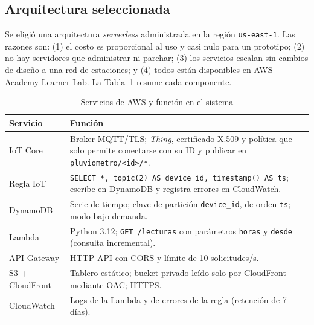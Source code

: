 \documentclass[10pt,twocolumn,letterpaper]{article}
\begin{document}
\subsection{Arquitectura seleccionada}
Se eligió una arquitectura \emph{serverless} administrada en la región \texttt{us-east-1}. Las razones son: (1) el costo es proporcional al uso y casi nulo para un prototipo; (2) no hay servidores que administrar ni parchar; (3) los servicios escalan sin cambios de diseño a una red de estaciones; y (4) todos están disponibles en AWS Academy Learner Lab. La Tabla~\ref{tab:serv} resume cada componente.

\begin{table}[t]
\caption{Servicios de AWS y función en el sistema}
\label{tab:serv}
\centering\footnotesize
\begin{tabularx}{\columnwidth}{@{}lX@{}}
\toprule
Servicio & Función\\
\midrule
IoT Core & Broker MQTT/TLS; \emph{Thing}, certificado X.509 y política que solo permite conectarse con su ID y publicar en \texttt{pluviometro/<id>/*}.\\
Regla IoT & \texttt{SELECT *, topic(2) AS device\_id, timestamp() AS ts}; escribe en DynamoDB y registra errores en CloudWatch.\\
DynamoDB & Serie de tiempo; clave de partición \texttt{device\_id}, de orden \texttt{ts}; modo bajo demanda.\\
Lambda & Python 3.12; \texttt{GET /lecturas} con parámetros \texttt{horas} y \texttt{desde} (consulta incremental).\\
API Gateway & HTTP API con CORS y límite de 10 solicitudes/s.\\
S3 + CloudFront & Tablero estático; bucket privado leído solo por CloudFront mediante OAC; HTTPS.\\
CloudWatch & Logs de la Lambda y de errores de la regla (retención de 7 días).\\
\bottomrule
\end{tabularx}
\end{table}
\end{document}
